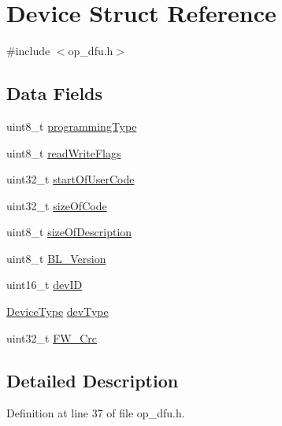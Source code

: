 \hypertarget{struct_device}{\section{\-Device \-Struct \-Reference}
\label{struct_device}
}


{\ttfamily \#include $<$op\-\_\-dfu.\-h$>$}

\subsection*{\-Data \-Fields}
\begin{DoxyCompactItemize}
\item 
uint8\-\_\-t \hyperlink{group___copter_control_b_l_ga233c334d07cb137f8460511393f09b1f}{programming\-Type}
\item 
uint8\-\_\-t \hyperlink{group___copter_control_b_l_ga9c191d83ffbfc96da5ddb6bfed066afb}{read\-Write\-Flags}
\item 
uint32\-\_\-t \hyperlink{group___copter_control_b_l_ga34965e275b7c25a39a849f168098b130}{start\-Of\-User\-Code}
\item 
uint32\-\_\-t \hyperlink{group___copter_control_b_l_ga83624b47fe4a34ab22c97ef29934bc80}{size\-Of\-Code}
\item 
uint8\-\_\-t \hyperlink{group___copter_control_b_l_gaac3d654cfb50d91e3d886848c630d481}{size\-Of\-Description}
\item 
uint8\-\_\-t \hyperlink{group___copter_control_b_l_gae487fa50d1de851605401068ef8730fb}{\-B\-L\-\_\-\-Version}
\item 
uint16\-\_\-t \hyperlink{group___copter_control_b_l_gac279d7f2e95b5ea61c2838cace97e0f3}{dev\-I\-D}
\item 
\hyperlink{group___copter_control_b_l_gad258d4c51629346fceac4679b3209ad9}{\-Device\-Type} \hyperlink{group___copter_control_b_l_ga94b1db8f05f4e21fc5f00333a46c2352}{dev\-Type}
\item 
uint32\-\_\-t \hyperlink{group___copter_control_b_l_ga676a5d429497021b5ad095b527f935cc}{\-F\-W\-\_\-\-Crc}
\end{DoxyCompactItemize}


\subsection{\-Detailed \-Description}


\-Definition at line 37 of file op\-\_\-dfu.\-h.



